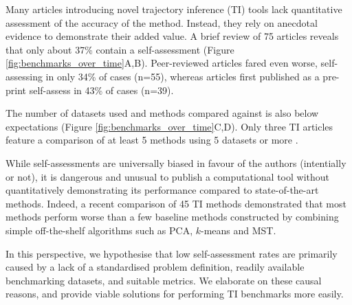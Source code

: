
Many articles introducing novel trajectory inference (TI) tools lack quantitative assessment of the accuracy of the method. Instead, they rely on anecdotal evidence to demonstrate their added value. A brief review of 75 articles reveals that only about 37\% contain a self-assessment (Figure \ref{fig:benchmarks_over_time}A,B). Peer-reviewed articles fared even worse, self-assessing in only 34\% of cases (n=55), whereas articles first published as a pre-print self-assess in 43\% of cases (n=39).

The number of datasets used and methods compared against is also below expectations (Figure \ref{fig:benchmarks_over_time}C,D). Only three TI articles feature a comparison of at least 5 methods using 5 datasets or more \cite{sharma_forksfindingorderings_2017,guo_hoplandsinglecellpseudotime_2017,parra_reconstructingcomplexlineage_2018}.

While self-assessments are universally biased in favour of the authors\cite{norel_selfassessmenttrapcan_2011} (intentially or not), it is dangerous and unusual to publish a computational tool without quantitatively demonstrating its performance compared to state-of-the-art methods. Indeed, a recent comparison of 45 TI methods demonstrated that most methods perform worse than a few baseline methods constructed by combining simple off-the-shelf algorithms such as PCA, $k$-means and MST\cite{saelens_comparisonsinglecelltrajectory_2019}.

In this perspective, we hypothesise that low self-assessment rates are primarily caused by a lack of a standardised problem definition, readily available benchmarking datasets, and suitable metrics. 
We elaborate on these causal reasons, and provide viable solutions for performing TI benchmarks more easily.

